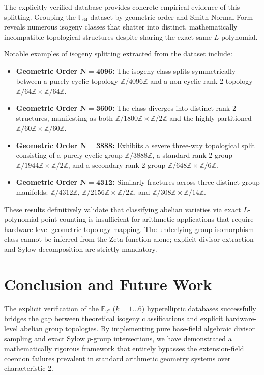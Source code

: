 \documentclass[letterpaper, 11pt]{article}
\begin{document}
The explicitly verified database provides concrete empirical evidence of this splitting. Grouping the $\mathbb{F}_{64}$ dataset by geometric order and Smith Normal Form reveals numerous isogeny classes that shatter into distinct, mathematically incompatible topological structures despite sharing the exact same $L$-polynomial.

Notable examples of isogeny splitting extracted from the dataset include:
\begin{itemize}
    \item \textbf{Geometric Order $\mathbf{N=4096}$:} The isogeny class splits symmetrically between a purely cyclic topology $\mathbb{Z}/4096\mathbb{Z}$ and a non-cyclic rank-2 topology $\mathbb{Z}/64\mathbb{Z} \times \mathbb{Z}/64\mathbb{Z}$.
    \item \textbf{Geometric Order $\mathbf{N=3600}$:} The class diverges into distinct rank-2 structures, manifesting as both $\mathbb{Z}/1800\mathbb{Z} \times \mathbb{Z}/2\mathbb{Z}$ and the highly partitioned $\mathbb{Z}/60\mathbb{Z} \times \mathbb{Z}/60\mathbb{Z}$.
    \item \textbf{Geometric Order $\mathbf{N=3888}$:} Exhibits a severe three-way topological split consisting of a purely cyclic group $\mathbb{Z}/3888\mathbb{Z}$, a standard rank-2 group $\mathbb{Z}/1944\mathbb{Z} \times \mathbb{Z}/2\mathbb{Z}$, and a secondary rank-2 group $\mathbb{Z}/648\mathbb{Z} \times \mathbb{Z}/6\mathbb{Z}$.
    \item \textbf{Geometric Order $\mathbf{N=4312}$:} Similarly fractures across three distinct group manifolds: $\mathbb{Z}/4312\mathbb{Z}$, $\mathbb{Z}/2156\mathbb{Z} \times \mathbb{Z}/2\mathbb{Z}$, and $\mathbb{Z}/308\mathbb{Z} \times \mathbb{Z}/14\mathbb{Z}$.
\end{itemize}

These results definitively validate that classifying abelian varieties via exact $L$-polynomial point counting is insufficient for arithmetic applications that require hardware-level geometric topology mapping. The underlying group isomorphism class cannot be inferred from the Zeta function alone; explicit divisor extraction and Sylow decomposition are strictly mandatory.

\section{Conclusion and Future Work}
The explicit verification of the $\mathbb{F}_{2^k}$ ($k=1 \dots 6$) hyperelliptic databases successfully bridges the gap between theoretical isogeny classifications and explicit hardware-level abelian group topologies. By implementing pure base-field algebraic divisor sampling and exact Sylow $p$-group intersections, we have demonstrated a mathematically rigorous framework that entirely bypasses the extension-field coercion failures prevalent in standard arithmetic geometry systems over characteristic 2.
\end{document}
